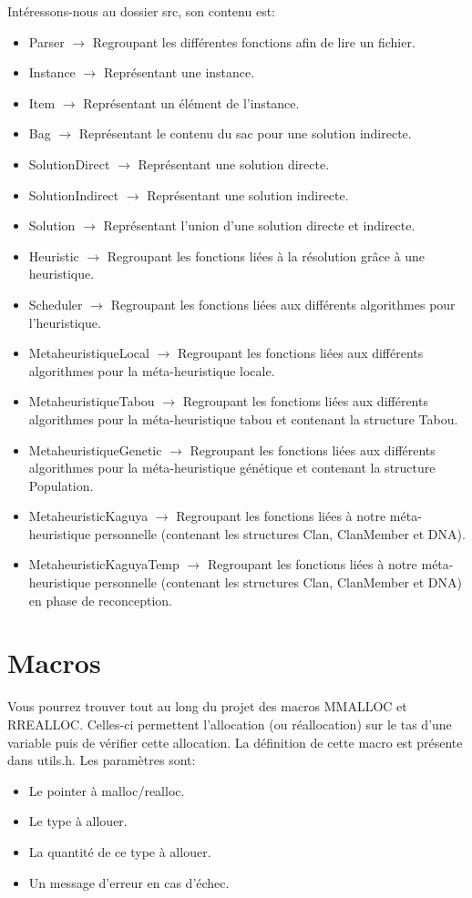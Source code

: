 \documentclass{EPUProjetPeiP}
\begin{document}
Intéressons-nous au dossier src, son contenu est:
\begin{itemize}
	\item Parser $\longrightarrow$ Regroupant les différentes fonctions afin de lire un fichier.
	\item Instance $\longrightarrow$ Représentant une instance.
	\item Item $\longrightarrow$ Représentant un élément de l'instance.
	\item Bag $\longrightarrow$ Représentant le contenu du sac pour une solution indirecte.
	\item SolutionDirect $\longrightarrow$ Représentant une solution directe.
	\item SolutionIndirect $\longrightarrow$ Représentant une solution indirecte.
	\item Solution $\longrightarrow$ Représentant l'union d'une solution directe et indirecte.
	\item Heuristic $\longrightarrow$ Regroupant les fonctions liées à la résolution grâce à une heuristique.
	\item Scheduler $\longrightarrow$ Regroupant les fonctions liées aux différents algorithmes pour l'heuristique.
	\item MetaheuristiqueLocal $\longrightarrow$ Regroupant les fonctions liées aux différents algorithmes pour la méta-heuristique locale.
	\item MetaheuristiqueTabou $\longrightarrow$ Regroupant les fonctions liées aux différents algorithmes pour la méta-heuristique tabou et contenant la structure Tabou.
	\item MetaheuristiqueGenetic $\longrightarrow$ Regroupant les fonctions liées aux différents algorithmes pour la méta-heuristique génétique et contenant la structure Population.
	\item MetaheuristicKaguya $\longrightarrow$ Regroupant les fonctions liées à notre méta-heuristique personnelle (contenant les structures Clan, ClanMember et DNA).
	\item MetaheuristicKaguyaTemp $\longrightarrow$ Regroupant les fonctions liées à notre méta-heuristique personnelle (contenant les structures Clan, ClanMember et DNA) en phase de reconception.
\end{itemize}

\section{Macros}
Vous pourrez trouver tout au long du projet des macros MMALLOC et RREALLOC. Celles-ci permettent l'allocation (ou réallocation) sur le tas d'une variable puis de vérifier cette allocation. La définition de cette macro est présente dans utils.h. Les paramètres sont:
	\begin{itemize}
		\item Le pointer à malloc/realloc.
		\item Le type à allouer.
		\item La quantité de ce type à allouer.
		\item Un message d'erreur en cas d'échec.
	\end{itemize}
\end{document}
